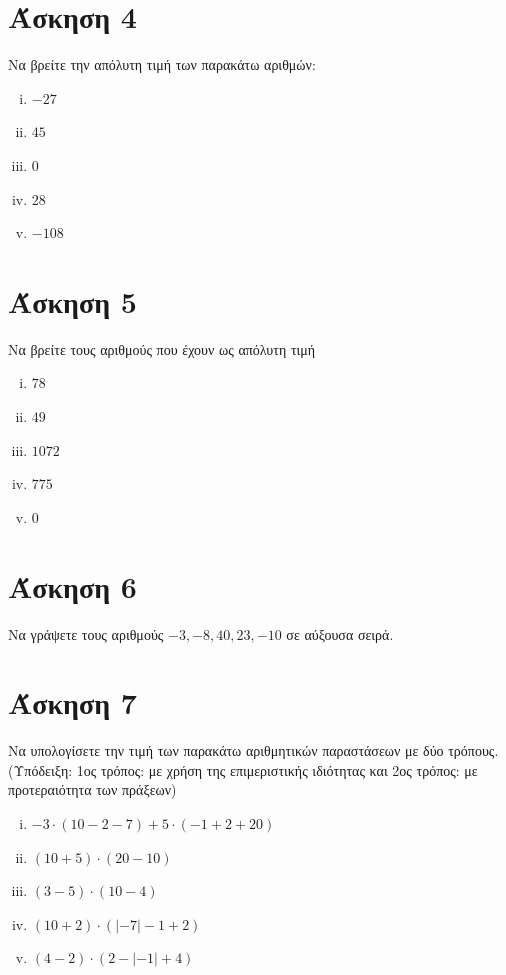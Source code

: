 \documentclass[a4paper,10pt]{report}
\begin{document}
\section*{Άσκηση 4  \hfill \small{}}
Να βρείτε την απόλυτη τιμή των παρακάτω αριθμών: 
\begin{enumerate}[i)]
 \item $-27$
 \item $45$
 \item $0$
 \item $28$
 \item $-108$
\end{enumerate}



\section*{Άσκηση 5  \hfill \small{}}
Να βρείτε τους αριθμούς που έχουν ως απόλυτη τιμή 
\begin{enumerate}[i)]
 \item $78$
 \item $49$
 \item $1072$
 \item $775$
 \item $0$
\end{enumerate}



\section*{Άσκηση 6  \hfill \small{}}
Να γράψετε τους αριθμούς $-3,-8,40,23,-10$ σε αύξουσα σειρά.

\section*{Άσκηση 7  \hfill \small{}}
Να υπολογίσετε την τιμή των παρακάτω αριθμητικών παραστάσεων με δύο τρόπους.\\
(Υπόδειξη: 1ος τρόπος: με χρήση της επιμεριστικής ιδιότητας και 2ος τρόπος: με προτεραιότητα των πράξεων)
\begin{enumerate}[i)]
 \item $-3\cdot (10-2-7)+5\cdot (-1+2+20)$
 \item $(10+5)\cdot (20-10)$
 \item $(3-5)\cdot (10-4)$
 \item $(10+2)\cdot (|-7|-1+2)$
 \item $(4-2)\cdot (2-|-1|+4)$
\end{enumerate}
\end{document}

